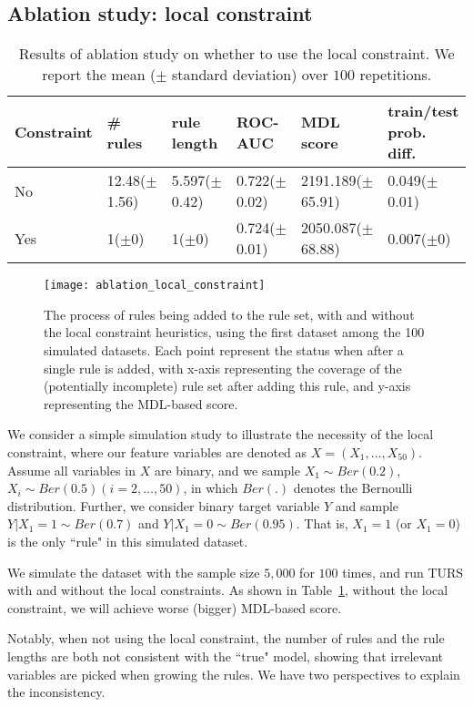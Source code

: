 \subsection{Ablation study: local constraint}
\begin{table}[ht]
\small
\centering
\begin{tabular}{llllll}
  \hline
Constraint & \# rules & rule length & ROC-AUC & MDL score & train/test prob. diff. \\ 
  \hline
No & 12.48($\pm$1.56) & 5.597($\pm$0.42) & 0.722($\pm$0.02) & 2191.189($\pm$65.91) & 0.049($\pm$0.01) \\ 
  Yes & 1($\pm$0) & 1($\pm$0) & 0.724($\pm$0.01) & 2050.087($\pm$68.88) & 0.007($\pm$0) \\ 
   \hline\end{tabular}
\caption{Results of ablation study on whether to use the local constraint. We report the mean ($\pm$ standard deviation) over $100$ repetitions. } \label{table:ablation_simu}
\end{table}
\begin{figure}[ht]
	\texttt{[image: ablation\_local\_constraint]}
	\caption{The process of rules being added to the rule set, with and without the local constraint heuristics, using the first  dataset among the 100 simulated datasets. Each point represent the status when after a single rule is added, with x-axis representing the coverage of the (potentially incomplete) rule set after adding this rule, and y-axis representing the MDL-based score. } \label{fig:ablation_simulation}
\end{figure}
We consider a simple simulation study to illustrate the necessity of the local constraint, where our feature variables are denoted as $X = (X_1, ..., X_{50})$. Assume all variables in $X$ are binary, and we sample $X_1 \sim Ber(0.2)$, $X_i \sim Ber(0.5) (i = 2, ..., 50)$, in which $Ber(.)$ denotes the Bernoulli distribution. Further, we consider binary target variable $Y$ and sample $Y|X_1 = 1 \sim Ber(0.7)$ and $Y|X_1 = 0 \sim Ber(0.95)$. That is, $X_1 = 1$ (or $X_1 = 0$) is the only ``rule" in this simulated dataset. 

We simulate the dataset with the sample size $5,000$ for $100$ times, and run TURS with and without the local constraints. As shown in Table~\ref{table:ablation_simu}, without the local constraint, we will achieve worse (bigger) MDL-based score. 

Notably, when not using the local constraint, the number of rules  and the rule lengths are both not consistent with the ``true" model, showing that irrelevant variables are picked when growing the rules. We have two perspectives to explain the inconsistency. 

